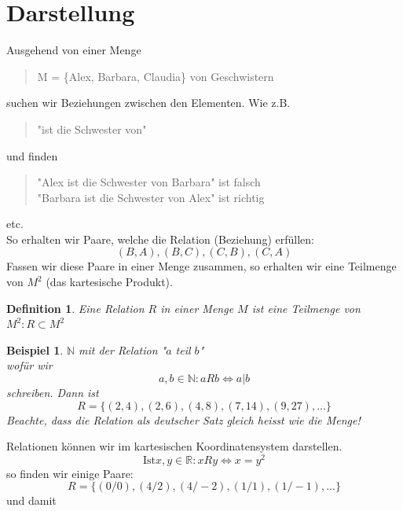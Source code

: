 \documentclass{report}
\newtheorem{mydef}{Definition}
\newtheorem{myexample}{Beispiel}
\begin{document}
\section{Darstellung}
Ausgehend von einer Menge
\begin{quote}M = \{Alex, Barbara, Claudia\} von Geschwistern\end{quote}
suchen wir Beziehungen zwischen den Elementen. Wie z.B.
\begin{quote}"ist die Schwester von"\end{quote}
und finden
\begin{quote}"Alex ist die Schwester von Barbara" ist falsch\\
"Barbara ist die Schwester von Alex" ist richtig\end{quote}
etc.\\
So erhalten wir Paare, welche die Relation (Beziehung) erfüllen:
\begin{equation}(B,A),(B,C),(C,B),(C,A)\end{equation}
Fassen wir diese Paare in einer Menge zusammen, so erhalten wir eine Teilmenge von $M^2$ (das kartesische Produkt).
\begin{mydef}Eine Relation $R$ in einer Menge $M$ ist eine Teilmenge von $M^2: R \subset M^2$\end{mydef}
\begin{myexample}$\mathbb{N}$ mit der Relation "$a$ teil $b$"\\
wofür wir
\begin{equation}a,b \in \mathbb{N}: a R b \iff a | b\end{equation}
schreiben. Dann ist
\begin{equation}R = \{(2,4),(2,6),(4,8),(7,14),(9,27),...\}\end{equation}
Beachte, dass die Relation als deutscher Satz gleich heisst wie die Menge!\end{myexample}
Relationen können wir im kartesischen Koordinatensystem darstellen.
\begin{equation}\mbox{Ist} x,y \in \mathbb{R}: x R y \iff x = y^2\end{equation}
so finden wir einige Paare:
\begin{equation}R= \{(0/0),(4/2),(4/-2),(1/1),(1/-1),...\}\end{equation}
und damit
\end{document}
